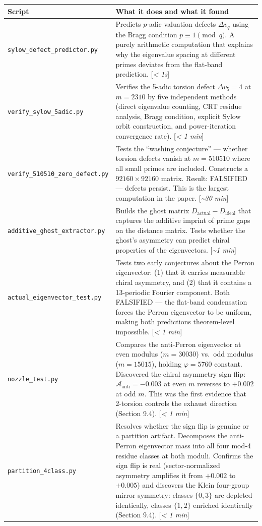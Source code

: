 \documentclass[11pt,letterpaper]{article}
\theoremstyle{definition}
\theoremstyle{remark}
\begin{document}
\begin{longtable}[]{@{}
  >{\raggedright\arraybackslash}p{}
  >{\raggedright\arraybackslash}p{}@{}}
\toprule
Script & What it does and what it found \\
\midrule
\endfirsthead
\endhead
\texttt{sylow\_defect\_predictor.py} & Predicts $p$-adic valuation defects $\Delta v_q$ using the Bragg condition $p \equiv 1 \pmod{q}$. A purely arithmetic computation that explains why the eigenvalue spacing at different primes deviates from the flat-band prediction. [\textit{\textless{} 1s}] \\
\texttt{verify\_sylow\_5adic.py} & Verifies the 5-adic torsion defect $\Delta v_5 = 4$ at $m = 2310$ by five independent methods (direct eigenvalue counting, CRT residue analysis, Bragg condition, explicit Sylow orbit construction, and power-iteration convergence rate). [\textit{\textless{} 1 min}] \\
\texttt{verify\_510510\_zero\_defect.py} & Tests the ``washing conjecture'' --- whether torsion defects vanish at $m = 510510$ where all small primes are included. Constructs a $92160 \times 92160$ matrix. Result: FALSIFIED --- defects persist. This is the largest computation in the paper. [\textit{\textasciitilde30 min}] \\
\texttt{additive\_ghost\_extractor.py} & Builds the ghost matrix $D_{\text{actual}} - D_{\text{ideal}}$ that captures the additive imprint of prime gaps on the distance matrix. Tests whether the ghost's asymmetry can predict chiral properties of the eigenvectors. [\textit{\textasciitilde1 min}] \\
\texttt{actual\_eigenvector\_test.py} & Tests two early conjectures about the Perron eigenvector: (1) that it carries measurable chiral asymmetry, and (2) that it contains a 13-periodic Fourier component. Both FALSIFIED --- the flat-band condensation forces the Perron eigenvector to be uniform, making both predictions theorem-level impossible. [\textit{\textless{} 1 min}] \\
\texttt{nozzle\_test.py} & Compares the anti-Perron eigenvector at even modulus ($m = 30030$) vs.~odd modulus ($m = 15015$), holding $\varphi = 5760$ constant. Discovered the chiral asymmetry sign flip: $\mathcal{A}_{\text{anti}} = -0.003$ at even $m$ reverses to $+0.002$ at odd $m$. This was the first evidence that 2-torsion controls the exhaust direction (Section 9.4). [\textit{\textless{} 1 min}] \\
\texttt{partition\_4class.py} & Resolves whether the sign flip is genuine or a partition artifact. Decomposes the anti-Perron eigenvector mass into all four mod-4 residue classes at both moduli. Confirms the sign flip is real (sector-normalized asymmetry amplifies it from $+0.002$ to $+0.005$) and discovers the Klein four-group mirror symmetry: classes $\{0, 3\}$ are depleted identically, classes $\{1, 2\}$ enriched identically (Section 9.4). [\textit{\textless{} 1 min}] \\
\end{longtable}
\end{document}

